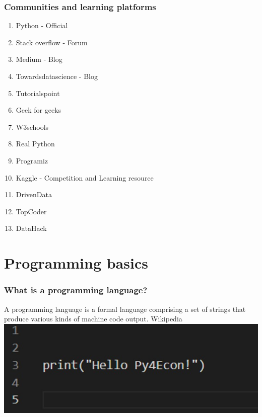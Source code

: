 \documentclass{beamer}
\begin{document}
\begin{frame}
    \frametitle{Communities and learning platforms}
    \begin{multicols}{2}
        \begin{enumerate}
            \item Python - Official
            \item Stack overflow - Forum
            \item Medium - Blog
            \item Towardsdatascience - Blog
            \item Tutorialspoint
            \item Geek for geeks
            \item W3schools
            \item Real Python
            \item Programiz
            \item Kaggle - Competition and Learning resource
            \item DrivenData
            \item TopCoder
            \item DataHack
        \end{enumerate}
    \end{multicols}
\end{frame}

\section{Programming basics} 
\frame{\tableofcontents[currentsection]}

\begin{frame}
    \frametitle{What is a programming language?}
    A programming language is a formal language comprising a set of strings 
    that produce various kinds of machine code output.
    Wikipedia \\
    \centering
    \includegraphics[scale = 0.3]{figures/hello.jpg}   
\end{frame}
\end{document}

